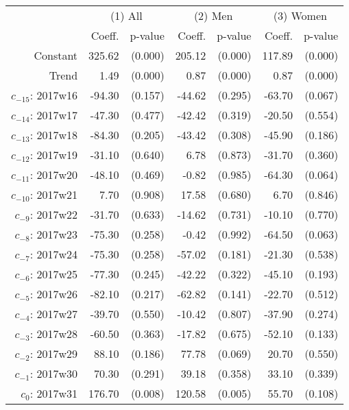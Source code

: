 \begin{threeparttable}
\begin{tabular}{@{}r|rr|rr|rr@{}} \hline\hline
 & \multicolumn{2}{c|}{(1) All} & \multicolumn{2}{c|}{(2) Men} &  \multicolumn{2}{c}{(3) Women} \\ 
 & Coeff. & p-value  & Coeff. & p-value & Coeff. & p-value \\ \hline
 Constant & 325.62  & (0.000) & 205.12  & (0.000)  & 117.89  & (0.000) \\ 
 Trend &  1.49  & (0.000) &  0.87  & (0.000)  &  0.87  & (0.000) \\ 
 $ c_{-15} $: 2017w16 & -94.30  & (0.157) & -44.62  & (0.295)  & -63.70  & (0.067) \\ 
 $ c_{-14} $: 2017w17 & -47.30  & (0.477) & -42.42  & (0.319)  & -20.50  & (0.554) \\ 
 $ c_{-13} $: 2017w18 & -84.30  & (0.205) & -43.42  & (0.308)  & -45.90  & (0.186) \\ 
 $ c_{-12} $: 2017w19 & -31.10  & (0.640) &  6.78  & (0.873)  & -31.70  & (0.360) \\ 
 $ c_{-11} $: 2017w20 & -48.10  & (0.469) & -0.82  & (0.985)  & -64.30  & (0.064) \\ 
 $ c_{-10} $: 2017w21 &  7.70  & (0.908) & 17.58  & (0.680)  &  6.70  & (0.846) \\ 
 $ c_{-9} $: 2017w22 & -31.70  & (0.633) & -14.62  & (0.731)  & -10.10  & (0.770) \\ 
 $ c_{-8} $: 2017w23 & -75.30  & (0.258) & -0.42  & (0.992)  & -64.50  & (0.063) \\ 
 $ c_{-7} $: 2017w24 & -75.30  & (0.258) & -57.02  & (0.181)  & -21.30  & (0.538) \\ 
 $ c_{-6} $: 2017w25 & -77.30  & (0.245) & -42.22  & (0.322)  & -45.10  & (0.193) \\ 
 $ c_{-5} $: 2017w26 & -82.10  & (0.217) & -62.82  & (0.141)  & -22.70  & (0.512) \\ 
 $ c_{-4} $: 2017w27 & -39.70  & (0.550) & -10.42  & (0.807)  & -37.90  & (0.274) \\ 
 $ c_{-3} $: 2017w28 & -60.50  & (0.363) & -17.82  & (0.675)  & -52.10  & (0.133) \\ 
 $ c_{-2} $: 2017w29 & 88.10  & (0.186) & 77.78  & (0.069)  & 20.70  & (0.550) \\ 
 $ c_{-1} $: 2017w30 & 70.30  & (0.291) & 39.18  & (0.358)  & 33.10  & (0.339) \\ 
 $ c_{0} $: 2017w31 & 176.70  & (0.008) & 120.58  & (0.005)  & 55.70  & (0.108) \\ 

\end{tabular}
\end{threeparttable}
